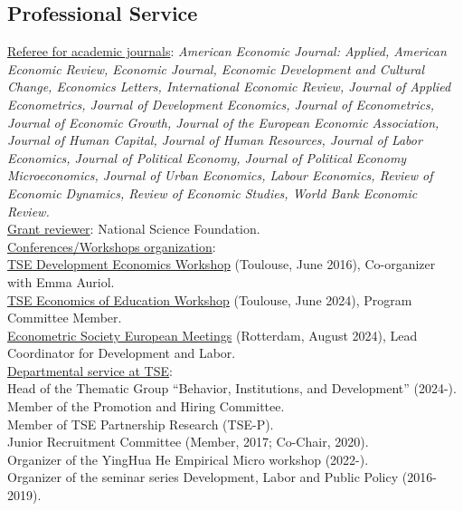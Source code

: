 \documentclass[12pt,english]{article}
\begin{document}
\subsection*{Professional Service}

\noindent \underline{Referee for academic journals}: \textit{American Economic Journal: Applied, American Economic Review, Economic Journal, Economic Development and Cultural Change, Economics Letters, International Economic Review, Journal of Applied Econometrics, Journal of Development Economics, Journal of Econometrics, Journal of Economic Growth, Journal of the European Economic Association, Journal of Human Capital, Journal of Human Resources, Journal of Labor Economics, Journal of Political Economy,  Journal of Political Economy Microeconomics, Journal of Urban Economics, Labour Economics, Review of Economic Dynamics, Review of Economic Studies, World Bank Economic Review.} \\

\noindent \underline{Grant reviewer}: National Science Foundation. \\

\noindent \underline{Conferences/Workshops organization}:\\
\href{https://www.tse-fr.eu/sites/default/files/TSE/documents/sem2016/development/development_workshop_program_130616.pdf}{TSE Development Economics Workshop} (Toulouse, June 2016), Co-organizer with Emma Auriol.\vspace{0.2cm} \\
\href{https://www.tse-fr.eu/conferences/2024-economics-education-workshop}{TSE Economics of Education Workshop} (Toulouse, June 2024), Program Committee Member. \vspace{0.2cm} \\
\href{https://www.eea-esem-congresses.org/}{Econometric Society European Meetings} (Rotterdam, August 2024), Lead Coordinator for Development and Labor.\vspace{0.2cm}\\



\noindent \underline{Departmental service at TSE}: \\
Head of the Thematic Group ``Behavior, Institutions, and Development'' (2024-).\vspace{0.2cm}\\
Member of the Promotion and Hiring Committee.\vspace{0.2cm}\\
Member of TSE Partnership Research (TSE-P). \vspace{0.2cm}\\
Junior Recruitment Committee (Member, 2017; Co-Chair, 2020).\vspace{0.2cm}\\
Organizer of the YingHua He Empirical Micro workshop (2022-).\vspace{0.2cm}\\
Organizer of the seminar series Development, Labor and Public Policy (2016-2019).
\end{document}
